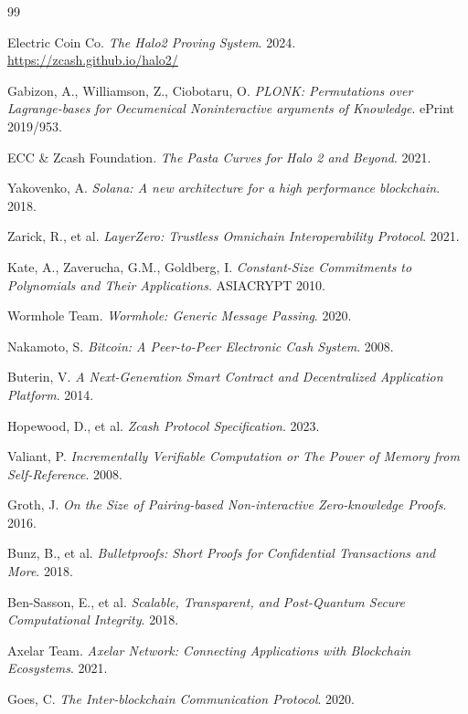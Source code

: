 \documentclass[11pt,a4paper]{article}
\begin{document}
\begin{thebibliography}{99}

Electric Coin Co. \textit{The Halo2 Proving System}. 2024. \url{https://zcash.github.io/halo2/}

Gabizon, A., Williamson, Z., Ciobotaru, O. \textit{PLONK: Permutations over Lagrange-bases for Oecumenical Noninteractive arguments of Knowledge}. ePrint 2019/953.

ECC \& Zcash Foundation. \textit{The Pasta Curves for Halo 2 and Beyond}. 2021.

Yakovenko, A. \textit{Solana: A new architecture for a high performance blockchain}. 2018.

Zarick, R., et al. \textit{LayerZero: Trustless Omnichain Interoperability Protocol}. 2021.

Kate, A., Zaverucha, G.M., Goldberg, I. \textit{Constant-Size Commitments to Polynomials and Their Applications}. ASIACRYPT 2010.

Wormhole Team. \textit{Wormhole: Generic Message Passing}. 2020.

Nakamoto, S. \textit{Bitcoin: A Peer-to-Peer Electronic Cash System}. 2008.

Buterin, V. \textit{A Next-Generation Smart Contract and Decentralized Application Platform}. 2014.

Hopewood, D., et al. \textit{Zcash Protocol Specification}. 2023.

Valiant, P. \textit{Incrementally Verifiable Computation or The Power of Memory from Self-Reference}. 2008.

Groth, J. \textit{On the Size of Pairing-based Non-interactive Zero-knowledge Proofs}. 2016.

Bunz, B., et al. \textit{Bulletproofs: Short Proofs for Confidential Transactions and More}. 2018.

Ben-Sasson, E., et al. \textit{Scalable, Transparent, and Post-Quantum Secure Computational Integrity}. 2018.

Axelar Team. \textit{Axelar Network: Connecting Applications with Blockchain Ecosystems}. 2021.

Goes, C. \textit{The Inter-blockchain Communication Protocol}. 2020.


\end{thebibliography}
\end{document}
